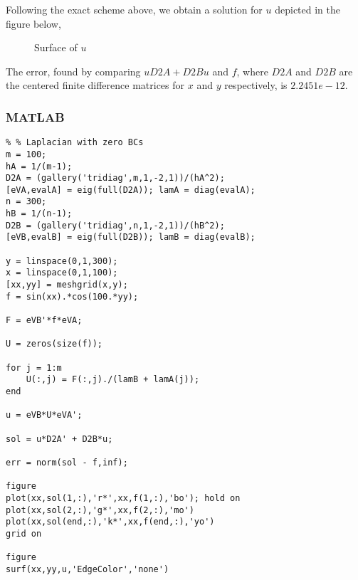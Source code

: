 \begin{questions}
\begin{solution}
\end{solution}


\begin{solution}

Following the exact scheme above, we obtain a solution for $u$ depicted in the figure below,

\begin{figure}[H]
\caption{Surface of $u$}
\end{figure}

The error, found by comparing $uD2A + D2Bu$ and $f$, where $D2A$ and $D2B$ are the centered finite difference matrices for $x$ and $y$ respectively, is $2.2451e-12$. 

\end{solution}

\end{questions}

\subsubsection*{MATLAB}

    \begin{verbatim}
% % Laplacian with zero BCs
m = 100;
hA = 1/(m-1);
D2A = (gallery('tridiag',m,1,-2,1))/(hA^2);
[eVA,evalA] = eig(full(D2A)); lamA = diag(evalA);
n = 300;
hB = 1/(n-1);
D2B = (gallery('tridiag',n,1,-2,1))/(hB^2);
[eVB,evalB] = eig(full(D2B)); lamB = diag(evalB);

y = linspace(0,1,300);
x = linspace(0,1,100);
[xx,yy] = meshgrid(x,y);
f = sin(xx).*cos(100.*yy);

F = eVB'*f*eVA;

U = zeros(size(f));

for j = 1:m
    U(:,j) = F(:,j)./(lamB + lamA(j));
end

u = eVB*U*eVA';

sol = u*D2A' + D2B*u;

err = norm(sol - f,inf);

figure
plot(xx,sol(1,:),'r*',xx,f(1,:),'bo'); hold on
plot(xx,sol(2,:),'g*',xx,f(2,:),'mo')
plot(xx,sol(end,:),'k*',xx,f(end,:),'yo')
grid on

figure
surf(xx,yy,u,'EdgeColor','none')
\end{verbatim}
